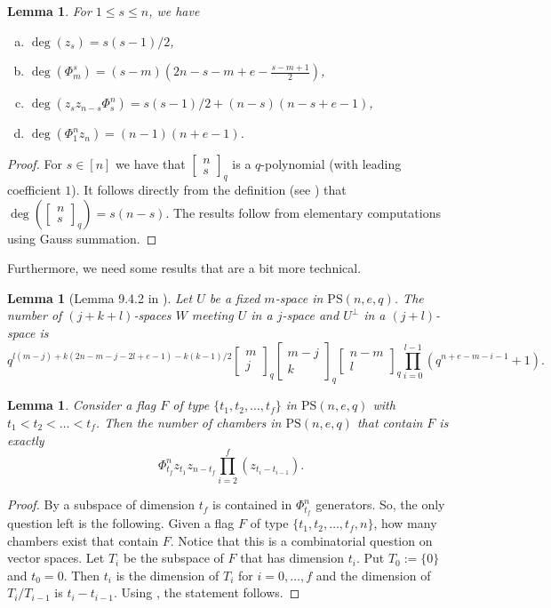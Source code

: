 \documentclass[11pt]{article}
\newtheorem{lemma}[thm]{Lemma}
\newcommand{\Gauss}[2]{{\begin{bmatrix} #1 \\ #2 \end{bmatrix}_q}}
\newcommand{\PS}{\mathrm{PS}}
\renewcommand{\leq}{\leqslant}
\begin{document}
\begin{lemma} \label{L:degree_stuff}
For $1\leq s\leq n$, we have
    \begin{enumerate} [(a)]
        \item $\deg(z_s)=s(s-1)/2$,
        \item $\deg(\Phi_m^s)=(s-m)(2n-s-m+e-\frac{s-m+1}{2})$,
        \item $\deg(z_sz_{n-s}\Phi_s^n)=s(s-1)/2+(n-s)(n-s+e-1)$,
        \item $\deg(\Phi_1^nz_n)=(n-1)(n+e-1)$.
    \end{enumerate}
\end{lemma}
\begin{proof}
For $s\in [n]$ we have that $\Gauss{n}{s}$ is a $q$-polynomial (with leading coefficient $1$). It follows directly from the definition (see ) that $\deg\left(\Gauss{n}{s}\right)=s(n-s)$. The results follow from elementary computations using Gauss summation. 
\end{proof}



Furthermore, we need some results that are a bit more technical.


\begin{lemma} [Lemma 9.4.2 in \cite{distance-regular-graphs}] \label{L:advanced_comb}
Let $U$ be a fixed $m$-space in $\PS(n,e,q)$. The number of $(j+k+l)$-spaces $W$ meeting $U$ in a $j$-space and $U^\perp$ in a $(j+l)$-space is 
$$ q^{l(m-j)+k(2n-m-j-2l+e-1)-k(k-1)/2}\Gauss{m}{j}\Gauss{m-j}{k}\Gauss{n-m}{l} \prod\limits_{i=0}^{l-1}(q^{n+e-m-i-1}+1). $$
\end{lemma}





\begin{lemma} \label{L: extend flags}
	Consider a flag $F$ of type $\{t_1,t_2, \ldots ,t_f \}$ in $\PS(n,e,q)$ with $t_1 < t_2 < \dots < t_f$. Then the number of chambers in $\PS(n,e,q)$ that contain $F$ is exactly
  $$\Phi_{t_f}^n z_{t_1}z_{n-t_f}\prod_{i=2}^f(z_{t_i-t_{i-1}}). $$ 
\end{lemma}
\begin{proof}
By  a subspace of dimension $t_f$ is contained in $\Phi_{t_f}^n$ generators. So, the only question left is the following. Given a flag $F$ of type $\{t_1,t_2, \ldots ,t_f,n \}$, how many chambers exist that contain $F$. Notice that this is a combinatorial question on vector spaces. Let $T_i$ be the subspace of $F$ that has dimension $t_i$. Put $T_0:=\{0\}$ and $t_0=0$. Then $t_i$ is the dimension of $T_i$ for $i=0,\hdots,f$ and the dimension of $T_i/T_{i-1}$ is $t_i-t_{i-1}$. Using , the statement follows.
\end{proof}
\end{document}
